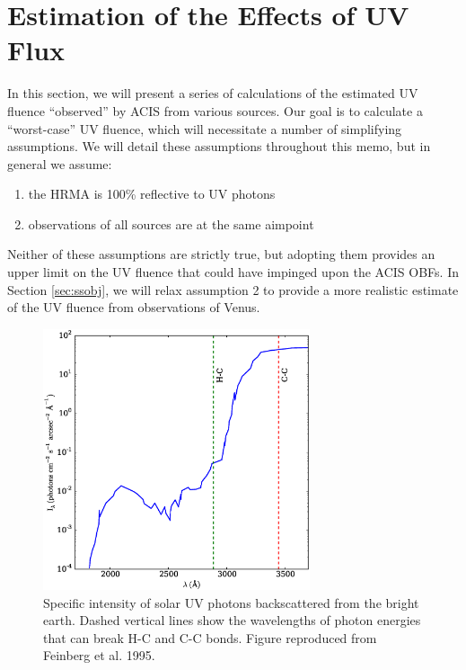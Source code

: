 \documentclass[11pt]{article}
\begin{document}
\section{Estimation of the Effects of UV Flux}

In this section, we will present a series of calculations of the estimated UV fluence
``observed'' by ACIS from various sources. Our goal is to calculate a ``worst-case'' UV
fluence, which will necessitate a number of simplifying assumptions. We will detail these
assumptions throughout this memo, but in general we assume:

\begin{enumerate}
\item the HRMA is 100\% reflective to UV photons
\item observations of all sources are at the same aimpoint
\end{enumerate}

Neither of these assumptions are strictly true, but adopting them provides an upper limit on
the UV fluence that could have impinged upon the ACIS OBFs. In Section \ref{sec:ssobj}, we
will relax assumption 2 to provide a more realistic estimate of the UV fluence from observations
of Venus.

\begin{figure}
\begin{center}
\includegraphics[width=0.7\textwidth]{bright_earth_intensity.eps}
\caption{Specific intensity of solar UV photons backscattered from the bright earth. Dashed
vertical lines show the wavelengths of photon energies that can break H-C and C-C bonds.
Figure reproduced from Feinberg et al. 1995.\label{fig:bright_earth_intensity}}
\end{center}
\end{figure}
\end{document}
